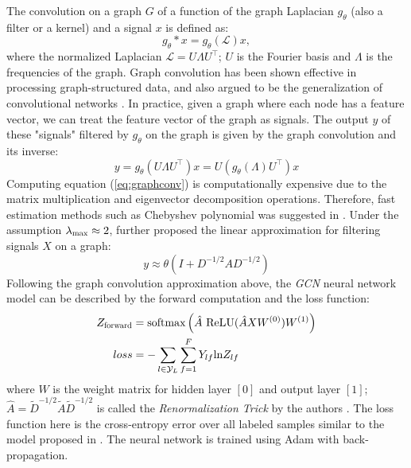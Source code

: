 \documentclass{article}
\theoremstyle{definition}
\begin{document}
The convolution on a graph $G$ of a function of the graph 
Laplacian $g_{\theta}$ (also a filter or a kernel) 
and a signal $x$ is defined as:
$$g_{\theta} \ast x = g_{\theta}(\mathcal{L}) x,$$
where the normalized Laplacian $\mathcal{L} = U \Lambda U^\top$; 
$U$ is the Fourier basis and $\Lambda$ is the frequencies of the graph. 
Graph convolution has been shown effective in processing
graph-structured data, and also argued to be the generalization
of convolutional networks
\cite{shuman2013emerging,defferrard2016convolutional,gcn}.
In practice, given a graph where each node has a feature vector,
we can treat the feature vector of the graph as signals. The output $y$
of these "signals" filtered by $g_\theta$ on the graph is given by
the graph convolution and its inverse: 
\begin{equation}
\label{eq:graphconv}
y = g_\theta (U \Lambda U^\top) x = U (g_\theta(\Lambda) U^\top)x
\end{equation}
Computing equation (\ref{eq:graphconv}) is computationally expensive
due to the matrix multiplication and eigenvector decomposition operations.
Therefore, fast estimation methods such as Chebyshev polynomial was suggested
in \cite{hammond2011wavelets}. Under the assumption
$\lambda_{\scalebox{0.75}{max}} \approx 2$, \citeauthor{gcn} further
proposed the linear approximation for filtering signals $X$ on a graph:
\begin{equation}
\label{eq:gcnapprox}
y \approx \theta \left( I + D^{-1/2}
A D^{-1/2} \right)
\end{equation}
Following the graph convolution approximation above, the \emph{GCN} neural network
model can be described by the forward computation and the loss function:
\begin{equation}
\label{eq:gcnnn}
\begin{aligned}
	Z_{\scalebox{0.75}{forward}} &=
\mbox{softmax}\left(\hat{A} \mbox{ ReLU}(\hat{A}XW^{(0)})W^{(1)}\right) \\
	loss &= -\sum_{l \in \mathcal{Y}_L} \sum^F_{f=1} Y_{lf}\mbox{ln} Z_{lf} \\
\end{aligned}
\end{equation}
where $W$ is the weight matrix for hidden layer $[0]$ and output layer $[1]$;
$\hat{A} = \tilde{D}^{-1/2} \tilde{A} \tilde{D}^{-1/2}$ is called the
\emph{Renormalization Trick} by the authors \cite{gcn}. The loss function here
is the cross-entropy error over all labeled samples similar to the model proposed
in \cite{planetoid}. The neural network is trained using Adam \cite{adam} with
back-propagation. 
\end{document}
